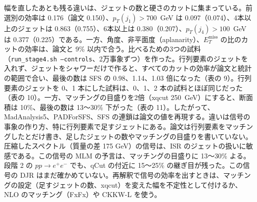 \documentclass[a4paper,10pt]{ltjsarticle}
\begin{document}
幅を直したあとも残る違いは、ジェットの数と硬さのカットに集まっている。前選別の効率は 0.176（論文 0.150）、$p_T(j_1)>700$~GeV は 0.097（0.074）、4本以上のジェットは 0.863（0.755）、6本以上は 0.380（0.207）、$p_T(j_4)>100$~GeV は 0.377（0.225）である。一方、角度、非平面度（aplanarity）、$E_T^{\mathrm{miss}}$ の比のカットの効率は、論文と 9\% 以内で合う。比べるための3つの試料（\texttt{run\_stage4.sh --controls}、2万事象ずつ）を作った。行列要素のジェットを入れず、ジェットをシャワーだけで作ると、すべてのカットの効率が論文と統計の範囲で合い、最後の数は SFS の 0.98、1.14、1.03 倍になった（表の 9）。行列要素のジェットを 0、1 本にした試料は、0、1、2 本の試料とほぼ同じだった（表の 10）。一方、マッチングの目盛りを2倍（xqcut 250~GeV）にすると、断面積は 10\%、最後の数は 13〜30\% 下がった（表の 11）。したがって、MadAnalysis5、PADForSFS、SFS の連鎖は論文の値を再現する。違いは信号の事象の作り方、特に行列要素で足すジェットにある。論文は行列要素をマッチングしたとだけ書き、足したジェットの数やマッチングの目盛りを書いていない。圧縮したスペクトル（質量の差 175 GeV）の信号は、ISR のジェットの扱いに敏感である。この信号の MLM の予言は、マッチングの目盛りに 13〜30\% よる。段階 2 の $pp\to e^+e^-$ でも、qCut の付近に 15〜25\% の継ぎ目が残った。この信号の DJR はまだ確かめていない。再解釈で信号の効率を出すときは、マッチングの設定（足すジェットの数、xqcut）を変えた幅を不定性として付けるか、NLO のマッチング（FxFx）や CKKW-L を使う。
\end{document}
